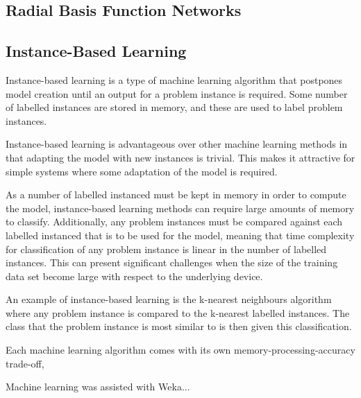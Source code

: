 \subsection{Radial Basis Function Networks}

\subsection{Instance-Based Learning}
Instance-based learning is a type of machine learning algorithm that postpones model creation until an output for a problem instance is required. Some number of labelled instances are stored in memory, and these are used to label problem instances.

Instance-based learning is advantageous over other machine learning methods in that adapting the model with new instances is trivial. This makes it attractive for simple systems where some adaptation of the model is required.

As a number of labelled instanced must be kept in memory in order to compute the model, instance-based learning methods can require large amounts of memory to classify. Additionally, any problem instances must be compared against each labelled instanced that is to be used for the model, meaning that time complexity for classification of any problem instance is linear in the number of labelled instances. This can present significant challenges when the size of the training data set become large with respect to the underlying device.

An example of instance-based learning is the k-nearest neighbours algorithm where any problem instance is compared to the k-nearest labelled instances. The class that the problem instance is most similar to is then given this classification. 

Each machine learning algorithm comes with its own memory-processing-accuracy trade-off, 

Machine learning was assisted with Weka... \todo{}



